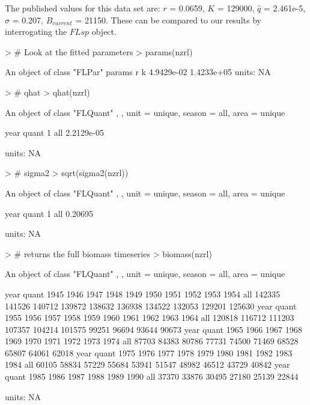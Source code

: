 \documentclass[a4paper]{article}
\begin{document}
The published values for this data set are:
$r$ = 0.0659, 
$K$ = 129000, 
$\hat{q}$ = 2.461e-5, 
$\sigma$ = 0.207, 
$B_{current}$ = 21150. 
These can be compared to our results by interrogating the $FLsp$ object.
\begin{center}
\begin{minipage}[H]{0.95\textwidth}%
\begin{shaded}%
\begin{Schunk}
\begin{Sinput}
> # Look at the fitted parameters
> params(nzrl)
\end{Sinput}
\begin{Soutput}
An object of class "FLPar"
params
         r          k 
4.9429e-02 1.4233e+05 
units:  NA 
\end{Soutput}
\begin{Sinput}
> # qhat
> qhat(nzrl)
\end{Sinput}
\begin{Soutput}
An object of class "FLQuant"
, , unit = unique, season = all, area = unique

     year
quant 1         
  all 2.2129e-05

units:  NA 
\end{Soutput}
\begin{Sinput}
> # sigma2
> sqrt(sigma2(nzrl))
\end{Sinput}
\begin{Soutput}
An object of class "FLQuant"
, , unit = unique, season = all, area = unique

     year
quant 1      
  all 0.20695

units:  NA 
\end{Soutput}
\begin{Sinput}
> # returns the full biomass timeseries
> biomass(nzrl)
\end{Sinput}
\begin{Soutput}
An object of class "FLQuant"
, , unit = unique, season = all, area = unique

     year
quant 1945   1946   1947   1948   1949   1950   1951   1952   1953   1954  
  all 142335 141526 140712 139872 138632 136938 134522 132053 129201 125630
     year
quant 1955   1956   1957   1958   1959   1960   1961   1962   1963   1964  
  all 120818 116712 111203 107357 104214 101575  99251  96694  93644  90673
     year
quant 1965   1966   1967   1968   1969   1970   1971   1972   1973   1974  
  all  87703  84383  80786  77731  74500  71469  68528  65807  64061  62018
     year
quant 1975   1976   1977   1978   1979   1980   1981   1982   1983   1984  
  all  60105  58834  57229  55684  53941  51547  48982  46512  43729  40842
     year
quant 1985   1986   1987   1988   1989   1990  
  all  37370  33876  30495  27180  25139  22844

units:  NA 
\end{Soutput}
\end{Schunk}
\end{shaded}%
\end{minipage}
\end{center}
\end{document}
